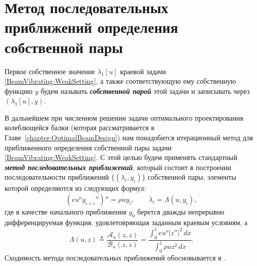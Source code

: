 \section{Метод последовательных приближений определения собственной пары}
\label{section:ApproximationsMethod}


\begin{definition}
Первое собственное значение $\lambda_1[u]$ краевой задачи
\eqref{BeamVibrating:WeakSetting},
а также соответствующую ему собственную функцию $y$
будем называть \emph{\textbf{собственной парой}} этой задачи и записывать через $(\lambda_1[u], y)$.
\end{definition}
%
%
%
\par
В дальнейшем при численном решении задачи оптимального проектирования колеблющейся балки
(которая рассматривается в Главе~\ref{chapter:OptimalBeamDesign})
нам понадобится итерационный метод для приближенного определения собственной пары задачи
\eqref{BeamVibrating:WeakSetting}.
%
%
%
С этой целью будем применять стандартный \emph{\textbf{метод последовательных приближений}},
который состоит в построении последовательности
приближений $\{ (\lambda_i, y_i) \}$ собственной пары,
элементы которой определяются из следующих формул:
\[
(eu^\nu y_{i + i}'')'' = \rho u y_i,
\qquad
\lambda_i = \Lambda(u, y_i),
\]
где в качестве начального приближения $y_0$ берется дважды непрерывно дифференцируемая функция,
удовлетовряющая заданным краевым условиям,
а
\[
\Lambda(u, z)
\triangleq
\frac{\mathcal{A}_u(z,z)}{\mathcal{B}_u(z,z)}
=
\frac
{\int_0^1 eu^\nu |z''|^2 \, dx}
{\int_0^1 \rho u z^2 \, dx}.
\]
%
%
%
Сходимость метода последовательных приближений
обосновывается в
\cite{book:Collatz}.
